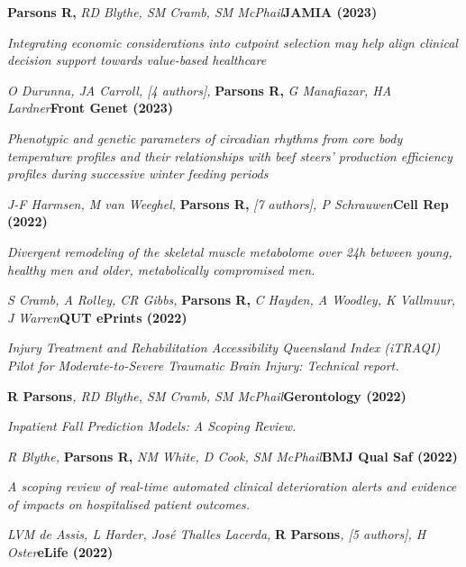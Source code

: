 \item
    \textbf{Parsons R, }\textit{RD Blythe, SM Cramb, SM McPhail}\textbf{\hfill{JAMIA (2023)}}\par
    \textit{
        Integrating economic considerations into cutpoint selection may help align clinical decision support \newline
        towards value-based healthcare
    }
\item
    \textit{O Durunna, JA Carroll, [4 authors], }\textbf{Parsons R, }\textit{G Manafiazar, HA Lardner}\textbf{\hfill{Front Genet (2023)}}\par
    \textit{
        Phenotypic and genetic parameters of circadian rhythms from core body temperature profiles and \newline
        their relationships with beef steers’ production efficiency profiles during successive winter feeding periods
    }
\item
    \textit{J-F Harmsen, M van Weeghel, }\textbf{Parsons R, }\textit{[7 authors], P Schrauwen}\textbf{\hfill{Cell Rep (2022)}}\par
    \textit{
        Divergent remodeling of the skeletal muscle metabolome over 24h between young, healthy men and older,\newline
        metabolically compromised men.
    }
\item
    \textit{S Cramb, A Rolley, CR Gibbs, }\textbf{Parsons R, }\textit{C Hayden, A Woodley, K Vallmuur, J Warren}\textbf{\hfill{QUT ePrints (2022)}}\par
	\textit{
        Injury Treatment and Rehabilitation Accessibility Queensland Index (iTRAQI) Pilot for Moderate-to-Severe \newline
        Traumatic Brain Injury: Technical report.
    }
\item
    \textbf{R Parsons}\textit{, RD Blythe, SM Cramb, SM McPhail}\textbf{\hfill Gerontology (2022)}\par
	\textit{Inpatient Fall Prediction Models: A Scoping Review.}
\item
	\textit{R Blythe, }\textbf{Parsons R, }\textit{NM White, D Cook, SM McPhail}\textbf{\hfill{BMJ Qual Saf (2022)}}\par
	\textit{A scoping review of real-time automated clinical deterioration alerts and evidence of impacts on hospitalised patient outcomes.}
\item
	\textit{LVM de Assis, L Harder, José Thalles Lacerda, }\textbf{R Parsons}\textit{, [5 authors], H Oster}\textbf{\hfill eLife (2022)}\par 

